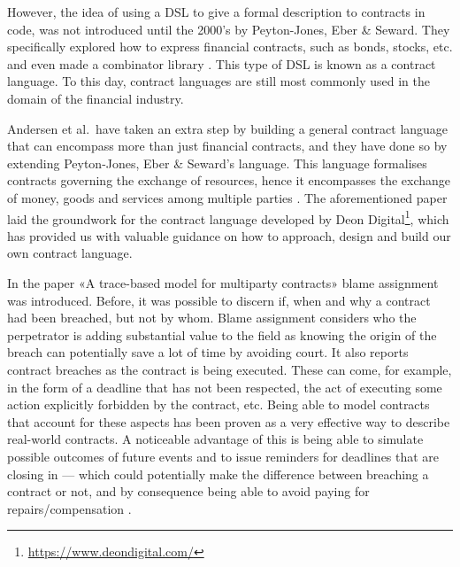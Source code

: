 \documentclass{ituthesis}
\begin{document}
However, the idea of using a DSL to give a formal description to contracts in code, was not introduced until the 2000's by Peyton-Jones, Eber \& Seward. They specifically explored how to express financial contracts, such as bonds, stocks, etc. and even made a combinator library \cite{peyton2000composing}. This type of DSL is known as a contract language. To this day, contract languages are still most commonly used in the domain of the financial industry.

Andersen et al.\ have taken an extra step by building a general contract language that can encompass more than just financial contracts, and they have done so by extending Peyton-Jones, Eber \& Seward's language. This language formalises contracts governing the exchange of resources, hence it encompasses the exchange of money, goods and services among multiple parties \cite{andersen2006compositional}. The aforementioned paper laid the groundwork for the contract language developed by Deon Digital\footnote{\url{https://www.deondigital.com/}}, which has provided us with valuable guidance on how to approach, design and build our own contract language.

In the paper «A trace-based model for multiparty contracts» blame assignment was introduced. Before, it was possible to discern if, when and why a contract had been breached, but not by whom. Blame assignment considers who the perpetrator is adding substantial value to the field as knowing the origin of the breach can potentially save a lot of time by avoiding court. It also reports contract breaches as the contract is being executed. These can come, for example, in the form of a deadline that has not been respected, the act of executing some action explicitly forbidden by the contract, etc. Being able to model contracts that account for these aspects has been proven as a very effective way to describe real-world contracts. A noticeable advantage of this is being able to simulate possible outcomes of future events and to issue reminders for deadlines that are closing in --- which could potentially make the difference between breaching a contract or not, and by consequence being able to avoid paying for repairs/compensation \cite{hvitved2012trace}.
\end{document}
